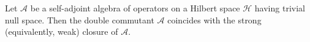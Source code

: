 Let $\mathcal{A}$ be a self-adjoint algebra of operators on a Hilbert space $\mathcal{H}$ having trivial null space. Then the double commutant $\mathcal{A}$ coincides with the strong (equivalently, weak) closure of $\mathcal{A}$.
